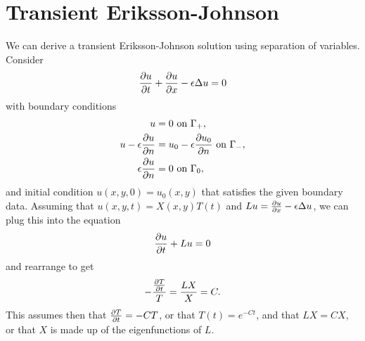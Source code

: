 \documentclass{article}
\begin{document}
\section{Transient Eriksson-Johnson}

We can derive a transient Eriksson-Johnson solution using separation of variables.  Consider
\[
\frac{\partial u}{\partial t} + \frac{\partial u}{\partial x} - \epsilon \Delta u = 0
\]
with boundary conditions
\begin{align*}
u &= 0 \text{ on } \Gamma_+,\\
u - \epsilon\frac{\partial u}{\partial n} &= u_0 - \epsilon\frac{\partial u_0}{\partial n} \text{ on }\Gamma_-,\\
\epsilon\frac{\partial u}{\partial n} &= 0 \text{ on } \Gamma_0,
\end{align*}
and initial condition $u(x,y,0) = u_0(x,y)$ that satisfies the given boundary data.  Assuming that $u(x,y,t) = X(x,y)T(t)$ and $Lu = \frac{\partial u}{\partial x} - \epsilon \Delta u$, we can plug this into the equation 
\[
\frac{\partial u}{\partial t} + Lu = 0
\]
and rearrange to get 
\[
-\frac{\frac{\partial T}{\partial t}}{T} = \frac{LX}{X} = C.
\]
This assumes then that $\frac{\partial T}{\partial t} = -CT$, or that $T(t) = e^{-Ct}$, and that $LX = CX$, or that $X$ is made up of the eigenfunctions of $L$.  
\end{document}
